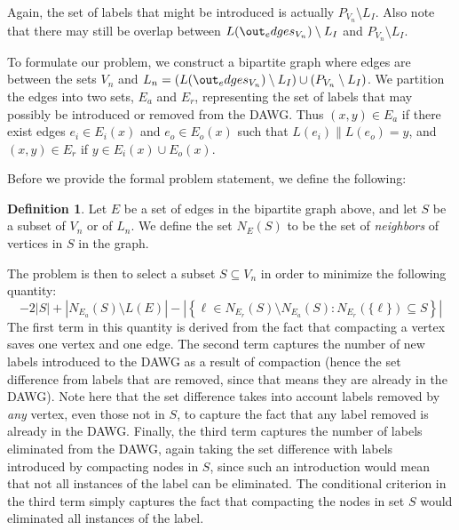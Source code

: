 \documentclass{article}
\newcommand{\emxs}[1]{\ensuremath{#1}\xspace}
\newcommand{\edges}{\emxs{E}}
\newcommand{\immutlabels}{\emxs{L_I}}
\newcommand{\labelfunc}{\emxs{L}}
\newcommand{\vertices}{\emxs{V}}
\theoremstyle{definition}
\newtheorem{definition}{Definition}
\begin{document}
Again, the set of labels that might be introduced is actually $P_{\vertices_n}
\setminus \immutlabels$. Also note that there may still be overlap between
$\labelfunc(\out_edges_{\vertices_n}) \setminus \immutlabels$ and $P_{\vertices_n}
\setminus \immutlabels$.

To formulate our problem, we construct a bipartite graph where edges are between
the sets $\vertices_n$ and $\labelfunc_n = (\labelfunc(\out_edges_{\vertices_n})
\setminus \immutlabels) \cup (P_{\vertices_n} \setminus \immutlabels)$. We
partition the edges into two sets, $\edges_a$ and $\edges_r$, representing the
set of labels that may possibly be introduced or removed from the DAWG. Thus
$(x, y) \in \edges_a$ if there exist edges $e_i \in \edges_i(x)$ and $e_o \in
\edges_o(x)$ such that $\labelfunc(e_i) \| \labelfunc(e_o) = y$, and $(x, y) \in
\edges_r$ if $y \in \edges_i(x) \cup \edges_o(x)$.

Before we provide the formal problem statement, we define the following:

\begin{definition}
  Let $E$ be a set of edges in the bipartite graph above, and let $S$ be a
  subset of $\vertices_n$ or of $\labelfunc_n$. We define the set $N_E(S)$ to be
  the set of \emph{neighbors} of vertices in $S$ in the graph.
\end{definition}

The problem is then to select a subset $S \subseteq \vertices_n$ in order to
minimize the following quantity:
\[
  -2|S| + |N_{\edges_a}(S) \setminus \labelfunc(\edges)| - \left|\left\{
    \ell \in N_{\edges_r}(S) \setminus N_{\edges_a}(S): N_{\edges_r}(\{\ell\})
    \subseteq S \right\}\right|
\]
The first term in this quantity is derived from the fact that compacting a
vertex saves one vertex and one edge. The second term captures the number of new
labels introduced to the DAWG as a result of compaction (hence the set
difference from labels that are removed, since that means they are already in
the DAWG). Note here that the set difference takes into account labels removed
by \emph{any} vertex, even those not in $S$, to capture the fact that any label
removed is already in the DAWG. Finally, the third term captures the number of
labels eliminated from the DAWG, again taking the set difference with labels
introduced by compacting nodes in $S$, since such an introduction would mean
that not all instances of the label can be eliminated. The conditional criterion
in the third term simply captures the fact that compacting the nodes in set $S$
would eliminated all instances of the label.
\end{document}
